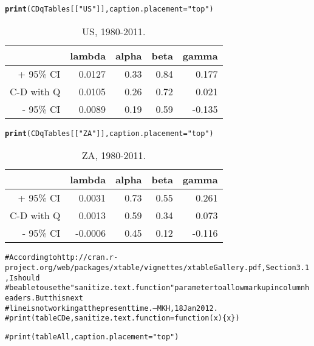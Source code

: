 \documentclass[preprint,authoryear,12pt]{elsarticle}\usepackage{graphicx, color}
\makeatletter
\newcommand{\hlfunctioncall}[1]{\textcolor[rgb]{0.501960784313725,0,0.329411764705882}{\textbf{#1}}}%
\newcommand{\hlstring}[1]{\textcolor[rgb]{0.6,0.6,1}{#1}}%
\newcommand{\hlcomment}[1]{\textcolor[rgb]{0.180392156862745,0.6,0.341176470588235}{#1}}%
\newenvironment{kframe}{%
 \def\at@end@of@kframe{}%
 \ifinner\ifhmode%
  \def\at@end@of@kframe{\end{minipage}}%
  \begin{minipage}{\columnwidth}%
 \fi\fi%
 \def\FrameCommand##1{\hskip\@totalleftmargin \hskip-\fboxsep
 \colorbox{shadecolor}{##1}\hskip-\fboxsep
     \hskip-\linewidth \hskip-\@totalleftmargin \hskip\columnwidth}%
 \MakeFramed {\advance\hsize-\width
   \@totalleftmargin\z@ \linewidth\hsize
   \@setminipage}}%
 {\par\unskip\endMakeFramed%
 \at@end@of@kframe}
\makeatother
\begin{document}
\begin{kframe}
\begin{alltt}
\hlfunctioncall{print}(CDqTables[[\hlstring{"US"}]], caption.placement=\hlstring{"top"})
\end{alltt}
\end{kframe}%
\begin{table}[ht]
\begin{center}
\caption{US, 1980-2011.}
\begin{tabular}{rrrrr}
  \hline
 & lambda & alpha & beta & gamma \\ 
  \hline
+ 95\% CI & 0.0127 & 0.33 & 0.84 & 0.177 \\ 
  C-D with Q & 0.0105 & 0.26 & 0.72 & 0.021 \\ 
  - 95\% CI & 0.0089 & 0.19 & 0.59 & -0.135 \\ 
   \hline
\end{tabular}
\end{center}
\end{table}
\begin{kframe}\begin{alltt}
\hlfunctioncall{print}(CDqTables[[\hlstring{"ZA"}]], caption.placement=\hlstring{"top"})
\end{alltt}
\end{kframe}%
\begin{table}[ht]
\begin{center}
\caption{ZA, 1980-2011.}
\begin{tabular}{rrrrr}
  \hline
 & lambda & alpha & beta & gamma \\ 
  \hline
+ 95\% CI & 0.0031 & 0.73 & 0.55 & 0.261 \\ 
  C-D with Q & 0.0013 & 0.59 & 0.34 & 0.073 \\ 
  - 95\% CI & -0.0006 & 0.45 & 0.12 & -0.116 \\ 
   \hline
\end{tabular}
\end{center}
\end{table}
\begin{kframe}\begin{alltt}
\hlcomment{# According to http://cran.r-project.org/web/packages/xtable/vignettes/xtableGallery.pdf, Section 3.1, I should }
\hlcomment{# be able to use the "sanitize.text.function" parameter to allow markup in column headers. But this next}
\hlcomment{# line is not working at the present time. --MKH, 18 Jan 2012.}
\hlcomment{# print(tableCDe, sanitize.text.function = function(x)\{x\})}

\hlcomment{#print(tableAll, caption.placement="top")}
\end{alltt}
\end{kframe}
\end{document}
